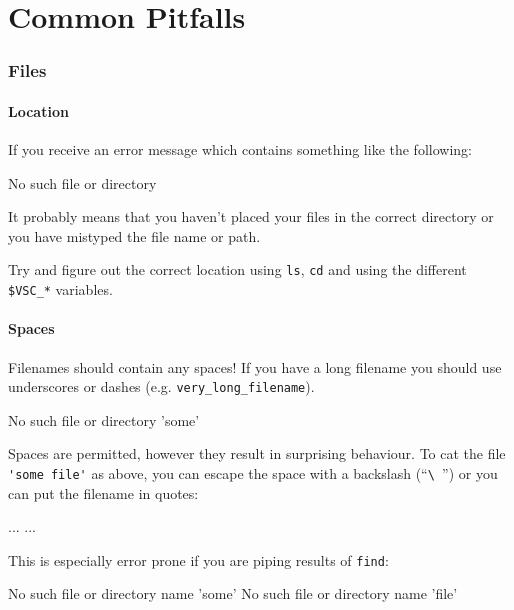 \chapter{Common Pitfalls}

\subsection{Files}

\subsubsection{Location}
If you receive an error message which contains something like the following:

\begin{prompt}
No such file or directory
\end{prompt}

It probably means that you haven't placed your files in the correct directory or
you have mistyped the file name or path.

Try and figure out the correct location using \verb|ls|, \verb|cd| and using the
different \verb|$VSC_*| variables.

\subsubsection{Spaces}

Filenames should  contain any spaces! If you have a long filename
you should use underscores or dashes (e.g. \verb|very_long_filename|).

\begin{prompt}
No such file or directory 'some'
\end{prompt}

Spaces are permitted, however they result in surprising behaviour. To cat the
file \verb|'some file'| as above, you can escape the space with a backslash (``\verb|\ |'')
or you can put the filename in quotes:

\begin{prompt}
...
...
\end{prompt}

This is especially error prone if you are piping results of \verb|find|:

\begin{prompt}
No such file or directory name 'some'
No such file or directory name 'file'
\end{prompt}

